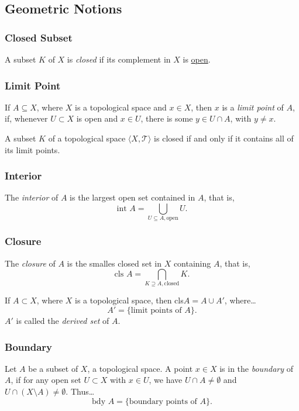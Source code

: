 \subsection{Geometric Notions}\label{geometricnotions}

\subsubsection{Closed Subset}\label{closed}
A subset $K$ of $X$ is \emph{closed} if its complement in $X$ is \hyperref[open]{open}.

\subsubsection{Limit Point}\label{limitpoint}
If $A \subseteq X$, where $X$ is a topological space and $x \in X$, then $x$ is a \emph{limit point}
of $A$, if, whenever $U \subset X$ is open and $x \in U$, there is some $y \in U \cap A$, with $y \neq x$.

\begin{proposition}
A subset $K$ of a topological space $\langle X, \mathcal{T} \rangle$ is closed if and only if it contains all of its limit points.
\end{proposition}

\subsubsection{Interior}\label{interior}
The \emph{interior} of $A$ is the largest open set contained in $A$, that is,
$$\textrm{int } A = \bigcup_{U \subseteq A, \textrm{open}}U.$$

\subsubsection{Closure}\label{closure}
The \emph{closure} of $A$ is the smalles closed set in $X$ containing $A$, that is,
$$\textrm{cls } A = \bigcap_{K \supseteq A, \textrm{closed}}K.$$

\begin{proposition}
If $A \subset X$, where $X$ is a topological space, then cls$A = A \cup A'$, where\dots
$$A' = \{ \textrm{limit points of } A \}.$$
$A'$ is called the \emph{derived set} of $A$.
\end{proposition}

\subsubsection{Boundary}\label{boundary}
Let $A$ be a subset of $X$, a topological space. A point $x \in X$ is in the \emph{boundary} of $A$, if for any open set $U \subset X$ with $x \in U$,
we have $U \cap A \neq \emptyset$ and $U \cap (X \setminus A) \neq \emptyset$. Thus\dots
$$\textrm{bdy }A = \{ \textrm{boundary points of } A \}.$$

